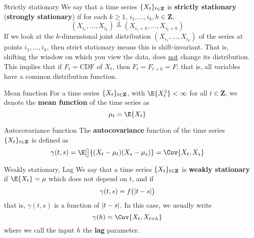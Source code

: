 \begin{Definition}{Strictly stationary}{}
    We say that a time series $ \{X_t\}_{t\in\mathbf{Z}} $
    is \textbf{strictly stationary} (\textbf{strongly stationary})
    if for each $ k\ge 1 $, $ i_1,\ldots,i_k,h\in\mathbf{Z} $,
    \[ (X_{i_1},\ldots,X_{i_k})\stackrel{\text{d}}{=}
        (X_{i_{1}+h},\ldots,X_{i_k+h}) \]
    {\color{blue}If we look at the $ k $-dimensional joint distribution
    $ (X_{i_1},\ldots,X_{i_k}) $
    of the series at points $ i_1,\ldots,i_k $, then
    strict stationary means this is shift-invariant.}
    That is, shifting the window on which
    you view the data, does \underline{not} change its distribution.
    This implies that if $ F_t=\text{CDF} $ of $ X_t $, then
    $ F_t=F_{t+h}=F $; that is, all variables have a common distribution function.
\end{Definition}
\begin{Definition}{Mean function}{}
    For a time series $ \{X_t\}_{t\in\mathbf{Z}} $, with
    $ \E{X_t^2}<\infty $ for all $ t\in\mathbf{Z} $,
    we denote the \textbf{mean function} of the time series as
    \[ \mu_t=\E{X_t} \]
\end{Definition}
\begin{Definition}{Autocovariance function}{}
    The \textbf{autocovariance} function of the time series $ \{X_t\}_{t\in\mathbf{Z}} $
    is defined as
    \[ \gamma(t,s)=\E[\big]{(X_t-\mu_t)(X_s-\mu_s)}=\Cov{X_t,X_s} \]
\end{Definition}
\begin{Definition}{Weakly stationary, Lag}{}
    We say that a time series $ \{X_t\}_{t\in\mathbf{Z}} $
    is \textbf{weakly stationary} if $ \E{X_t}=\mu $
    which does not depend on $ t $, and if
    \[ \gamma(t,s)=f\bigl(\lvert t-s\rvert\bigr) \]
    that is, $ \gamma(t,s) $ is a function of $ \lvert t-s\rvert $. In this case,
    we usually write
    \[ \gamma(h)=\Cov{X_t,X_{t+h}} \]
    where we call the input $ h $ the \textbf{lag} parameter.
\end{Definition}
